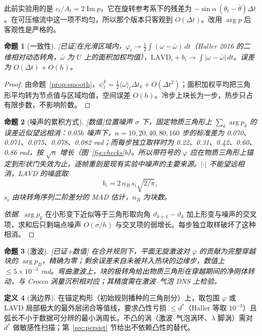 \documentclass[10.5pt,a4paper]{article}
\theoremstyle{definition}
\newtheorem{definition}{定义}[section]
\theoremstyle{plain}
\newtheorem{proposition}[definition]{命题}
\theoremstyle{remark}
\newcommand{\status}[1]{\hfill{\small\color{accent}\textsf{[#1]}}}
\newcommand{\im}{\operatorname{Im}}
\begin{document}
此前实验用的是 $c_t/A_t=2\im p$，它在旋转参考系下的残差为 $-\sin\alpha\,(\theta_t-\bar\theta)\Delta t$。在可压缩流中这一项不均匀，所以那个版本只客观到 $O(\Delta t)$。改用 $\arg p$ 后客观性是严格的。

\begin{proposition}[一致性]\status{已证}\label{prop:cons}
在光滑区域内，$\varphi_i\to\tfrac12\int(\omega-\bar\omega)\,dt$（Haller 2016 的二维相对动态转角，$\bar\omega$ 为 $U$ 上的面积加权均值），$\mathrm{LAVD}_i+b_i\to\int|\omega-\bar\omega|\,dt$。误差为 $O(\Delta t)+O(h)$。
\end{proposition}
\begin{proof}
由命题~\ref{prop:smooth}，$\psi_t^k=\tfrac12\langle\omega\rangle_t\Delta t_k+O(\Delta t^2)$；面积加权平均把三角形平均转为节点值与区域均值，空间误差 $O(h)$。冷步上块长为一步，热步只占有限步数，不影响阶数。
\end{proof}

\begin{proposition}[噪声的累积方式]\status{数值}\label{prop:noise}
位置噪声 $\sigma$ 下，固定物质三角形上 $\sum_k\arg p_k$ 的误差近似望远相消：0.05$h$ 噪声下，$n=10,20,40,80,160$ 步的标准差为 0.070、0.071、0.075、0.078、0.082 rad；而每步独立取样时为 0.22、0.31、0.42、0.60、0.86 rad，按 $\sqrt n$ 增长（图~\ref{fig:checks}b）。所以带符号的 $\varphi$ 应在物质三角形上锚定到形状门失效为止，逐帧重剖是现有实验中噪声的主要来源。$|\cdot|$ 不能望远相消，LAVD 的噪底取
\begin{equation}
b_i=2\,n_B\,s_i\sqrt{2/\pi},
\end{equation}
$s_i$ 由块转角序列二阶差分的 MAD 估计，$n_B$ 为块数。
\end{proposition}
\begin{proof}[依据]
$\arg p_k$ 在小形变下近似等于三角形取向角 $\vartheta_{k+1}-\vartheta_k$ 加上形变与噪声的交叉项，求和后只剩端点噪声 $O(\sigma/h)$ 与交叉项的弱增长。每步独立取样破坏了这种相消。
\end{proof}

\begin{proposition}[激波]\status{已证+数值}
在合并规则下，平面无旋激波对 $\varphi$ 的贡献为完整穿越块的 $\arg p_B$，精确为零；剩余误差来自未被并入热块的边缘步，数值上 $\le5\times10^{-3}$ rad。弯曲激波上，块的极转角给出物质三角形在穿越期间的净刚体转动，与 Crocco 涡量沉积相对应；其精度需在激波–气泡 DNS 上检验。
\end{proposition}

\begin{definition}[涡边界]
在锚定构形（初始规则播种的三角剖分）上，取包围 $\varphi$ 或 LAVD 局部极大的最外层闭合等值线，要求凸性亏损 $\le d^*$（Haller 等取 $10^{-3}$）且弧长不小于数据可分辨的最小涡周长。不凸的涡（激波–气泡涡环、$\lambda$ 脚涡）需对 $d^*$ 做敏感性扫描；第~\ref{sec:persist} 节给出不依赖凸性的替代。
\end{definition}
\end{document}
